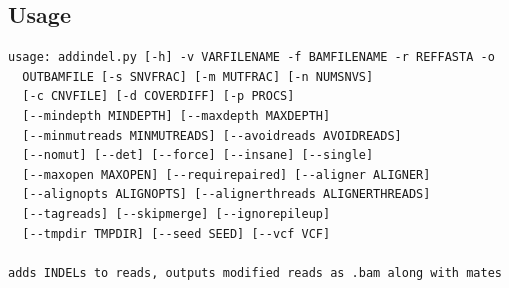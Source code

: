 \documentclass[letterpaper,11pt]{article}
\begin{document}
\subsection{Usage}
\begin{verbatim}
usage: addindel.py [-h] -v VARFILENAME -f BAMFILENAME -r REFFASTA -o
  OUTBAMFILE [-s SNVFRAC] [-m MUTFRAC] [-n NUMSNVS]
  [-c CNVFILE] [-d COVERDIFF] [-p PROCS]
  [--mindepth MINDEPTH] [--maxdepth MAXDEPTH]
  [--minmutreads MINMUTREADS] [--avoidreads AVOIDREADS]
  [--nomut] [--det] [--force] [--insane] [--single]
  [--maxopen MAXOPEN] [--requirepaired] [--aligner ALIGNER]
  [--alignopts ALIGNOPTS] [--alignerthreads ALIGNERTHREADS]
  [--tagreads] [--skipmerge] [--ignorepileup]
  [--tmpdir TMPDIR] [--seed SEED] [--vcf VCF]

adds INDELs to reads, outputs modified reads as .bam along with mates


\end{verbatim}
\end{document}
